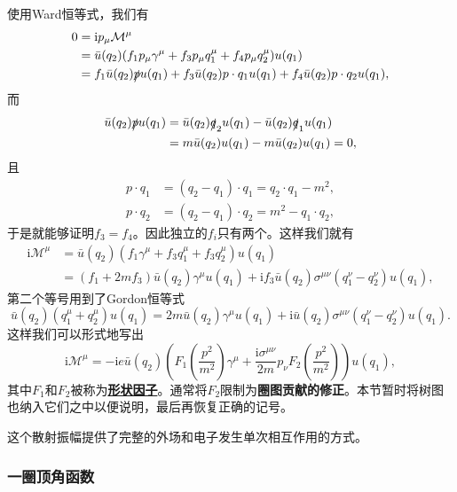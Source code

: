 \documentclass[hyperref, UTF8, a4paper]{ctexart}
\newcommand*{\ii}{\mathrm{i}}
\newcommand{\concept}[1]{\underline{\textbf{#1}}}
\renewcommand{\emph}{\textbf}
\begin{document}
使用Ward恒等式，我们有
\[
    \begin{aligned}
        0 &= \ii p_\mu \mathcal{M}^\mu \\
        &= \bar{u}(q_2) (f_1 p_\mu \gamma^\mu + f_3 p_\mu q_1^\mu + f_4 p_\mu q_2^\mu) u(q_1) \\
        &= f_1 \bar{u}(q_2) \slashed{p} u(q_1) + f_3 \bar{u}(q_2) p \cdot q_1 {u}(q_1) + f_4 \bar{u}(q_2) p \cdot q_2 u(q_1),
    \end{aligned}
\]
而
\[
    \begin{aligned}
        \bar{u}(q_2) \slashed{p} u(q_1) &= \bar{u}(q_2) \slashed{q}_2 u(q_1) - \bar{u}(q_2) \slashed{q}_1 u(q_1) \\
        &= m \bar{u}(q_2) u(q_1) - m \bar{u}(q_2) u(q_1) = 0,
    \end{aligned}
\]
且
\[
    \begin{aligned}
        p \cdot q_1 &= (q_2 - q_1) \cdot q_1 = q_2 \cdot q_1 - m^2, \\
        p \cdot q_2 &= (q_2 - q_1) \cdot q_2 = m^2 - q_1 \cdot q_2,
    \end{aligned}
\]
于是就能够证明$f_3=f_4$。因此独立的$f_i$只有两个。这样我们就有
\[
    \begin{aligned}
        \ii \mathcal{M}^\mu &= \bar{u}(q_2) (f_1 \gamma^\mu + f_3 q_1^\mu + f_3 q_2^\mu) u(q_1) \\
        &= (f_1 + 2m f_3) \bar{u}(q_2) \gamma^\mu u(q_1) + \ii f_3 \bar{u}(q_2) \sigma^{\mu \nu} (q_1^\nu - q_2^\nu) u(q_1), 
    \end{aligned}
\]
第二个等号用到了Gordon恒等式
\[
    \bar{u}(q_2) (q_1^\mu + q_2^\mu) u(q_1) = 2m \bar{u}(q_2) \gamma^\mu u(q_1) + \ii \bar{u}(q_2) \sigma^{\mu \nu} (q_1^\nu - q_2^\nu) u(q_1).
\]
这样我们可以形式地写出
\begin{equation}
    \ii \mathcal{M}^\mu = -\ii e \bar{u}(q_2) \left( F_1\left(\frac{p^2}{m^2}\right) \gamma^\mu + \frac{\ii \sigma^{\mu \nu}}{2m} p_\nu F_2\left(\frac{p^2}{m^2}\right) \right) u(q_1),
    \label{eq:form-factor-vertex}
\end{equation}
其中$F_1$和$F_2$被称为\concept{形状因子}。通常将$F_2$限制为\emph{圈图贡献的修正}。本节暂时将树图也纳入它们之中以便说明，最后再恢复正确的记号。

这个散射振幅提供了完整的外场和电子发生单次相互作用的方式。

\subsubsection{一圈顶角函数}
\end{document}

